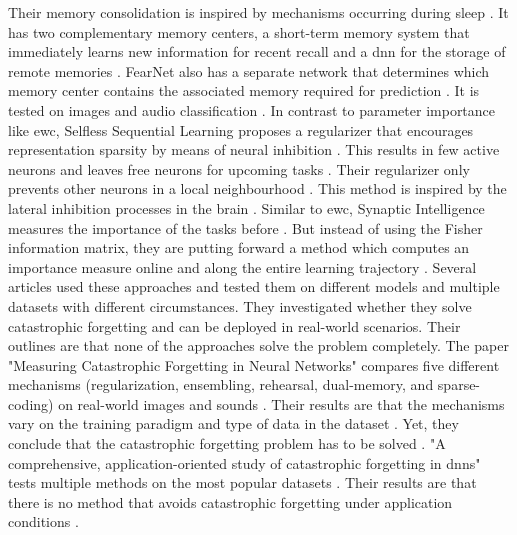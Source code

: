 Their memory consolidation is inspired by mechanisms occurring during sleep \cite{FearNet}.
It has two complementary memory centers, a short-term memory system that immediately learns new information for recent recall and a \acrshort{dnn} for the storage of remote memories \cite{FearNet}.
FearNet also has a separate network that determines which memory center contains the associated memory required for prediction \cite{FearNet}.
It is tested on images and audio classification \cite{FearNet}.
\newline
In contrast to parameter importance like \acrshort{ewc}, Selfless Sequential Learning proposes a regularizer that encourages representation sparsity by means of neural inhibition \cite{Selfless_Sequential_Learning}.
This results in few active neurons and leaves free neurons for upcoming tasks \cite{Selfless_Sequential_Learning}.
Their regularizer only prevents other neurons in a local neighbourhood \cite{Selfless_Sequential_Learning}.
This method is inspired by the lateral inhibition processes in the brain \cite{Selfless_Sequential_Learning}.
\newline
Similar to \acrshort{ewc}, Synaptic Intelligence measures the importance of the tasks before \cite{Synaptic_Intelligence}.
But instead of using the Fisher information matrix, they are putting forward a method which computes an importance measure online and along the entire learning trajectory \cite{Synaptic_Intelligence}.
\newline
Several articles used these approaches and tested them on different models and multiple datasets with different circumstances.
They investigated whether they solve catastrophic forgetting and can be deployed in real-world scenarios.
Their outlines are that none of the approaches solve the problem completely.
\cite{measuring_cf_in_nns, cf_application_oriented_study}
\newline
The paper "Measuring Catastrophic Forgetting in Neural Networks" compares five different mechanisms (regularization, ensembling, rehearsal, dual-memory, and sparse-coding) on real-world images and sounds \cite{measuring_cf_in_nns}.
Their results are that the mechanisms vary on the training paradigm and type of data in the dataset \cite{measuring_cf_in_nns}.
Yet, they conclude that the catastrophic forgetting problem has to be solved \cite{measuring_cf_in_nns}.
\newline
"A comprehensive, application-oriented study of catastrophic forgetting in \acrshort{dnn}s" \cite{cf_application_oriented_study} tests multiple methods on the most popular datasets \cite{cf_application_oriented_study}.
Their results are that there is no method that avoids catastrophic forgetting under application conditions \cite{cf_application_oriented_study}.

